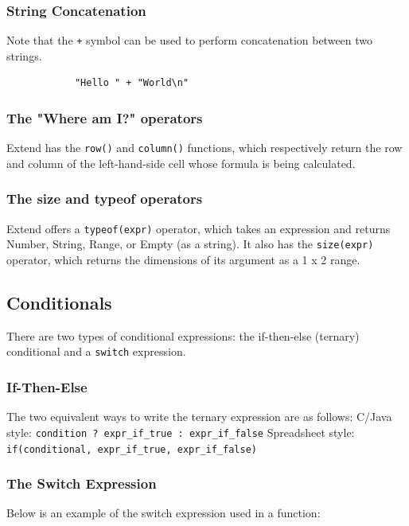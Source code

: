 		\subsubsection{String Concatenation}
		Note that the \texttt{+} symbol can be used to perform concatenation between two strings.

		\begin{lstlisting}
			"Hello " + "World\n"
		\end{lstlisting}

		\subsubsection{The "Where am I?" operators}
		Extend has the \texttt{row()} and \texttt{column()} functions, which respectively return the row and column of the left-hand-side cell whose formula is being calculated.

		\subsubsection{The size and typeof operators}
		Extend offers a \texttt{typeof(expr)} operator, which takes an expression and returns Number, String, Range, or Empty (as a string). It also has the \texttt{size(expr)} operator, which returns the dimensions of its argument as a 1 x 2 range.


	\subsection{Conditionals}
	There are two types of conditional expressions: the if-then-else (ternary) conditional and a \texttt{switch} expression.

		\subsubsection{If-Then-Else}
		The two equivalent ways to write the ternary expression are as follows: \newline \newline
		C/Java style: \texttt{condition ? expr\_if\_true : expr\_if\_false} \newline \newline
		Spreadsheet style: \texttt{if(conditional, expr\_if\_true, expr\_if\_false)}

		\subsubsection{The Switch Expression}
		Below is an example of the switch expression used in a function:

